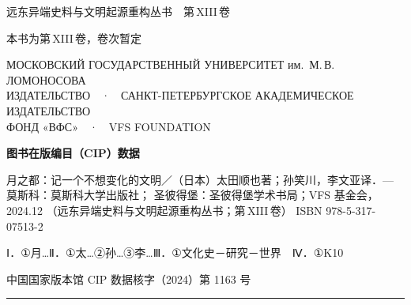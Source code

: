 \vfill

{\sffamily\footnotesize\color{pencil}
远东异端史料与文明起源重构丛书\ \ 第\,XIII\,卷\par}
{\footnotesize\color{pencil}
本书为第\,XIII\,卷，卷次暂定\par}
\endgroup
\clearpage

\thispagestyle{empty}
\begingroup
\footnotesize
\linespread{1.22}\selectfont
\centering
\begin{minipage}[t][\dimexpr\textheight-24pt\relax][s]{\textwidth}
\centering

{\sffamily\scriptsize\color{pencil}
МОСКОВСКИЙ ГОСУДАРСТВЕННЫЙ УНИВЕРСИТЕТ им.\ М.\,В.\,ЛОМОНОСОВА\\
ИЗДАТЕЛЬСТВО\ \ ·\ \ САНКТ-ПЕТЕРБУРГСКОЕ АКАДЕМИЧЕСКОЕ ИЗДАТЕЛЬСТВО\\
ФОНД «ВФС»\ \ ·\ \ VFS FOUNDATION\par}

\vspace{3.2mm}
{\bfseries 图书在版编目（CIP）数据\par}
\vspace{2mm}

\begin{minipage}{0.94\textwidth}
\raggedright
月之都：记一个不想变化的文明／（日本）太田顺也著；孙笑川，李文亚译．— 莫斯科：莫斯科大学出版社；
圣彼得堡：圣彼得堡学术书局；VFS 基金会，2024.12
（远东异端史料与文明起源重构丛书；第\,XIII\,卷）
ISBN 978-5-317-07513-2

\vspace{1.4mm}
\hspace{2em}Ⅰ．①月…\quad Ⅱ．①太…②孙…③李…\quad Ⅲ．①文化史－研究－世界\ \ Ⅳ．①K10

\vspace{1.4mm}
\hspace{2em}中国国家版本馆 CIP 数据核字（2024）第 1163 号
\end{minipage}

\vspace{3.2mm}
{\color{rulegrey}\rule{0.94\textwidth}{0.3pt}}
\vspace{2.4mm}


\end{minipage}
